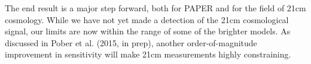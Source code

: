 \documentclass[twocolumn,numberedappendix]{emulateapj} \shorttitle{New Limits on the 21 cm Power Spectrum at $z=8.4$}
\newcommand{\pobercitet}{Pober et al. (2015, in prep)}
\begin{document}
The end result is a major step forward, both for PAPER and for the field of 21cm cosmology.
While we have not yet made a detection of the 21cm cosmological signal, our limits are
now within the range of some of the brighter models.  As discussed in \pobercitet,
another order-of-magnitude improvement in sensitivity will make 21cm measurements highly constraining.



%
%
%
\end{document}
